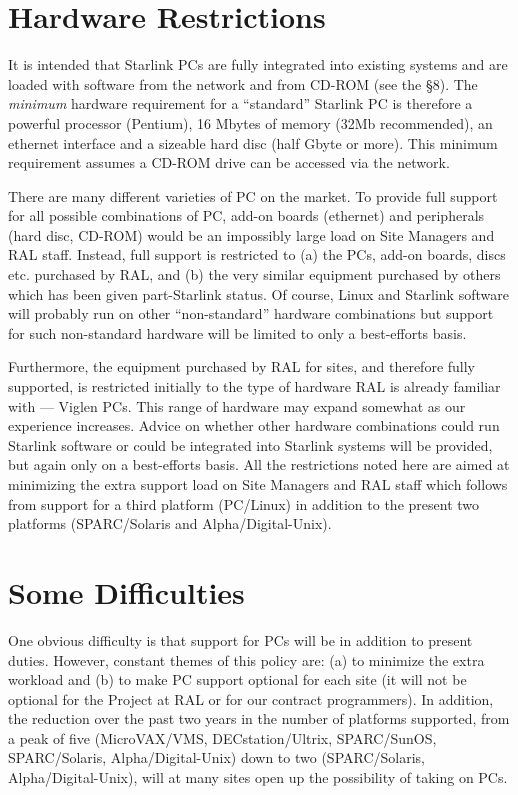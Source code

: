 \section{Hardware Restrictions}

It is intended that Starlink PCs are fully integrated into existing
systems and are loaded with software from the network and from CD-ROM
(see the \S 8).  The {\em minimum} hardware requirement for a
``standard'' Starlink PC is therefore a powerful processor (Pentium),
16 Mbytes of memory (32Mb recommended), an ethernet interface and a sizeable hard disc
(half Gbyte or more).  This minimum requirement assumes a CD-ROM drive
can be accessed via the network.

There are many different varieties of PC on the market.  To provide
full support for all possible combinations of PC, add-on boards
(ethernet) and peripherals (hard disc, CD-ROM) would be an impossibly
large load on Site Managers and RAL staff.   Instead, 
full support is restricted to  (a) the PCs, add-on boards, discs etc.
purchased by RAL, and (b) the very similar equipment purchased by
others which has been given part-Starlink status.  Of course, Linux and
Starlink software will probably run on other ``non-standard'' hardware
combinations but support for such non-standard hardware will be limited
to only a best-efforts basis.

Furthermore, the equipment purchased by RAL for sites, and
therefore fully supported, is restricted initially to the type of
hardware RAL is already familiar with --- Viglen PCs. 
This range of hardware may expand somewhat as our experience
increases.  Advice on whether other hardware combinations could run
Starlink software or could be integrated into Starlink systems will be
provided, but again only on a best-efforts basis.   All the
restrictions noted here are aimed at minimizing the extra support load on
Site Managers and RAL staff which follows from support for a third
platform (PC/Linux) in addition to the present two platforms
(SPARC/Solaris and Alpha/Digital-Unix).

\section{Some Difficulties}

One obvious difficulty is that support for PCs will be in addition to
present duties.   However,  constant themes of this policy are: (a) to
minimize the extra workload and (b) to make PC support optional for
each site (it will not be optional for the Project at RAL or for our
contract programmers).  In addition,  the reduction over the past two
years in the number of platforms supported, from a peak of five
(MicroVAX/VMS, DECstation/Ultrix, SPARC/SunOS, SPARC/Solaris,
Alpha/Digital-Unix) down to two (SPARC/Solaris, Alpha/Digital-Unix), 
will at many sites open up the possibility of taking on PCs.

